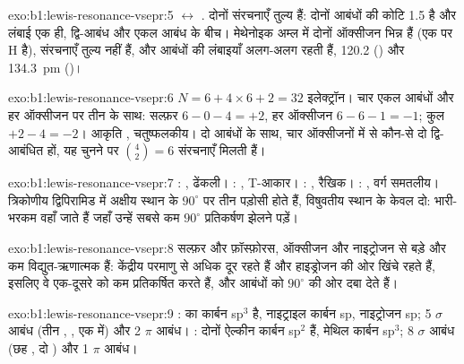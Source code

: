 \begin{solution}{exo:b1:lewis-resonance-vsepr:5}
$\leftrightarrow$
.
दोनों संरचनाएँ तुल्य हैं: दोनों  आबंधों की कोटि 1.5 है और
लंबाई एक ही, द्वि-आबंध और एकल आबंध के बीच। मेथेनोइक
अम्ल में दोनों ऑक्सीजन भिन्न हैं (एक पर H है), संरचनाएँ
तुल्य नहीं हैं, और आबंधों की लंबाइयाँ अलग-अलग रहती हैं, 120.2 () और
\qty{134.3}{pm} ()।
\end{solution}

\begin{solution}{exo:b1:lewis-resonance-vsepr:6}
$N = 6 + 4 \times 6 + 2 = 32$ इलेक्ट्रॉन। चार एकल आबंधों और हर ऑक्सीजन पर तीन
 के साथ: सल्फ़र $6 - 0 - 4 = +2$, हर ऑक्सीजन
$6 - 6 - 1 = -1$; कुल $+2 - 4 = -2$। आकृति , चतुष्फलकीय।
दो  आबंधों के साथ, चार ऑक्सीजनों में से कौन-से दो
द्वि-आबंधित हों, यह चुनने पर $\binom{4}{2} = 6$ संरचनाएँ मिलती हैं।
\end{solution}

\begin{solution}{exo:b1:lewis-resonance-vsepr:7}
: , ढेंकली। : , T-आकार।
: , रैखिक। : , वर्ग समतलीय।
त्रिकोणीय द्विपिरामिड में अक्षीय स्थान के $90^\circ$ पर तीन पड़ोसी होते हैं,
विषुवतीय स्थान के केवल दो: भारी-भरकम  वहाँ जाते हैं जहाँ उन्हें
सबसे कम $90^\circ$ प्रतिकर्षण झेलने पड़ें।
\end{solution}

\begin{solution}{exo:b1:lewis-resonance-vsepr:8}
सल्फ़र और फ़ॉस्फ़ोरस, ऑक्सीजन और नाइट्रोजन से बड़े और कम
विद्युत-ऋणात्मक हैं:  केंद्रीय परमाणु से अधिक दूर रहते हैं और
हाइड्रोजन की ओर खिंचे रहते हैं, इसलिए वे एक-दूसरे को कम प्रतिकर्षित करते हैं, और  आबंधों को $90^\circ$ की ओर दबा देते हैं।
\end{solution}

\begin{solution}{exo:b1:lewis-resonance-vsepr:9}
:  का कार्बन sp$^3$ है, नाइट्राइल कार्बन sp,
नाइट्रोजन sp; 5 $\sigma$ आबंध (तीन , , एक
 में) और 2 $\pi$ आबंध। : दोनों ऐल्कीन कार्बन
sp$^2$ हैं, मेथिल कार्बन sp$^3$; 8 $\sigma$ आबंध (छह , दो
) और 1 $\pi$ आबंध।
\end{solution}


